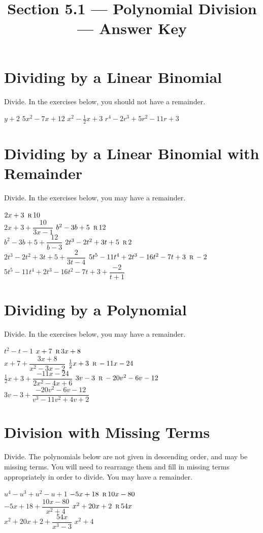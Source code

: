 

\title{Section 5.1 --- Polynomial Division --- Answer Key}

\newcommand{\twoform}[3]{$#1 \remainder #2$\\[\itemsep]$#1+\dfrac{#2}{#3}$}


\maketitle

\section*{Dividing by a Linear Binomial}
Divide.  In the exercises below, you should not have a remainder.
\begin{smenum}
\mitemxx
{$y+2$}
{$5x^2-7x+12$}
\mitemxx
{$x^2-\frac{1}{2}x+3$}
{$r^4-2r^3+5r^2-11r+3$}
\end{smenum}

\section*{Dividing by a Linear Binomial with Remainder}
Divide.  In the exercises below, you may have a remainder.
\begin{smenum}
\mitemxx
{\twoform{2x+3}{10}{3x-1}}
{\twoform{b^2-3b+5}{12}{b-3}}
\mitemxx
{\twoform{2t^3-2t^2+3t+5}{2}{3t-4}}
{\twoform{5t^5-11t^4+2t^3-16t^2-7t+3}{-2}{t+1}}
\end{smenum}

\section*{Dividing by a Polynomial}
Divide.  In the exercises below, you may have a remainder.
\begin{smenum}
\mitemxx
{$t^2-t-1$}
{\twoform{x+7}{3x+8}{x^2-3x-2}}
\mitemxx
{\twoform{\frac{1}{2}x+3}{-11x-24}{2x^2-4x+6}}
{\twoform{3v-3}{-20v^2-6v-12}{v^3-11v^2+4v+2}}
\end{smenum}


\section*{Division with Missing Terms}
Divide.  The polynomials below are not given in descending order, and may be missing terms.  You will need to rearrange them and fill in missing terms appropriately in order to divide.  You may have a remainder.
\begin{smenum}
\mitemxx
{$u^4-u^3+u^2-u+1$}
{\twoform{-5x+18}{10x-80}{x^2+4}}
\mitemxx
{\twoform{x^2+20x+2}{54x}{x^3-3}}
{$x^2+4$}
\end{smenum}

